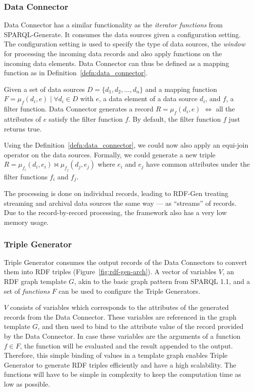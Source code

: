 \subsubsection{Data Connector}
Data Connector has a similar functionality as the \emph{iterator functions} from SPARQL-Generate.
It consumes the data sources given a configuration setting. The configuration setting is used to specify 
the type of data sources, the \emph{window} for processing the incoming data records and 
also apply functions on the incoming data elements. Data Connector can thus be defined as a 
mapping function as in Definition~\ref{defn:data_connector}. 


\begin{defn}
  \label{defn:data_connector}
  Given a set of data sources $D = \{d_1, d_2, \dots, d_n\}$ and  a 
  mapping function $F = \mu_{f}(d_i, e)\; |\; \forall d_i \in D$ with $e$, a data element 
  of a data source $d_i$, and $f$, a filter function. Data Connector 
  generates a record $R = \mu_{f}(d_i, e)$ $\iff$ all the attributes of 
  $e$ satisfy the filter function $f$. By default, the filter function $f$ just returns true. 
\end{defn}

Using the Definition~\ref{defn:data_connector}, we could now also apply an equi-join operator 
on the data sources. Formally, we could generate a new triple 
$R =  \mu_{f_i}(d_i, e_i) \bowtie  \mu_{f_j}(d_j, e_j) $ where $e_i$ and $e_j$ have 
common attributes under the filter functions $f_i$ and $f_j$. 

The processing is done on individual records, leading to 
RDF-Gen treating streaming and archival data sources the same way --- as “streams” 
of records. Due to the record-by-record processing, the framework also has a very low 
memory usage. 

\subsubsection{Triple Generator}
Triple Generator consumes the output records 
of the Data Connectors to convert them into RDF triples (Figure~\ref{fig:rdf-gen-arch}). A vector of variables $V$, an RDF 
graph template $G$, akin to the basic graph pattern from SPARQL 1.1, and a 
set of \emph{functions} $F$ can be used to configure the Triple Generators. 

$V$ consists of variables which corresponds to the attributes of the
generated records from the Data Connector. These variables are referenced 
in the graph template $G$, and then used to 
bind to the attribute value of the record provided by the Data Connector. 
In case these variables are the arguments of a function $f \in F$, the function will 
be evaluated and the result appended to the output. Therefore, 
this simple binding of values in a template graph enables Triple Generator to 
generate RDF triples efficiently and have a high scalability.
The functions will have to be simple in complexity to keep the computation 
time as low as possible.


